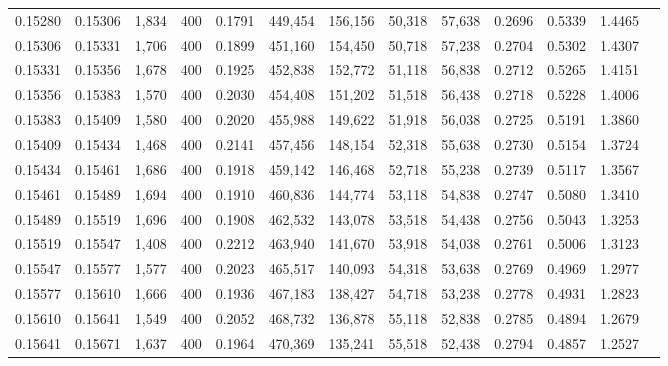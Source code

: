 \begin{tabular}{rrrrrrrrrrrrr}
0.15280 & 0.15306 &  1,834 &   400 &                                     0.1791 & 449,454 & 156,156 &  50,318 &  57,638 & 0.2696 & 0.5339 & 1.4465 \\
0.15306 & 0.15331 &  1,706 &   400 &                                     0.1899 & 451,160 & 154,450 &  50,718 &  57,238 & 0.2704 & 0.5302 & 1.4307 \\
0.15331 & 0.15356 &  1,678 &   400 &                                     0.1925 & 452,838 & 152,772 &  51,118 &  56,838 & 0.2712 & 0.5265 & 1.4151 \\
0.15356 & 0.15383 &  1,570 &   400 &                                     0.2030 & 454,408 & 151,202 &  51,518 &  56,438 & 0.2718 & 0.5228 & 1.4006 \\
0.15383 & 0.15409 &  1,580 &   400 &                                     0.2020 & 455,988 & 149,622 &  51,918 &  56,038 & 0.2725 & 0.5191 & 1.3860 \\
0.15409 & 0.15434 &  1,468 &   400 &                                     0.2141 & 457,456 & 148,154 &  52,318 &  55,638 & 0.2730 & 0.5154 & 1.3724 \\
0.15434 & 0.15461 &  1,686 &   400 &                                     0.1918 & 459,142 & 146,468 &  52,718 &  55,238 & 0.2739 & 0.5117 & 1.3567 \\
0.15461 & 0.15489 &  1,694 &   400 &                                     0.1910 & 460,836 & 144,774 &  53,118 &  54,838 & 0.2747 & 0.5080 & 1.3410 \\
0.15489 & 0.15519 &  1,696 &   400 &                                     0.1908 & 462,532 & 143,078 &  53,518 &  54,438 & 0.2756 & 0.5043 & 1.3253 \\
0.15519 & 0.15547 &  1,408 &   400 &                                     0.2212 & 463,940 & 141,670 &  53,918 &  54,038 & 0.2761 & 0.5006 & 1.3123 \\
0.15547 & 0.15577 &  1,577 &   400 &                                     0.2023 & 465,517 & 140,093 &  54,318 &  53,638 & 0.2769 & 0.4969 & 1.2977 \\
0.15577 & 0.15610 &  1,666 &   400 &                                     0.1936 & 467,183 & 138,427 &  54,718 &  53,238 & 0.2778 & 0.4931 & 1.2823 \\
0.15610 & 0.15641 &  1,549 &   400 &                                     0.2052 & 468,732 & 136,878 &  55,118 &  52,838 & 0.2785 & 0.4894 & 1.2679 \\
0.15641 & 0.15671 &  1,637 &   400 &                                     0.1964 & 470,369 & 135,241 &  55,518 &  52,438 & 0.2794 & 0.4857 & 1.2527 \\

\end{tabular}
